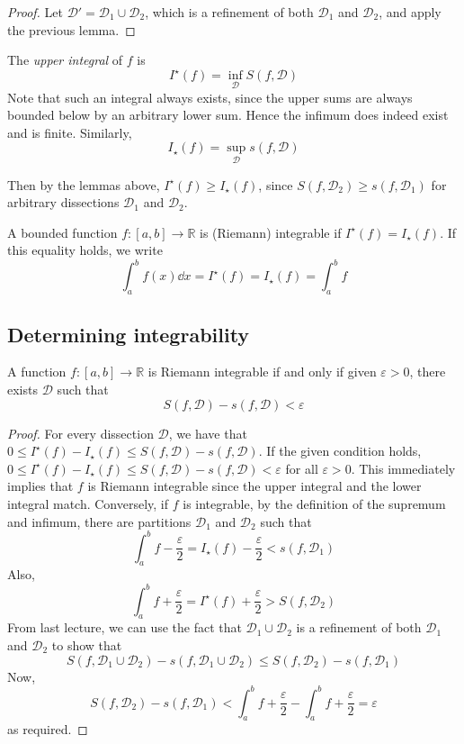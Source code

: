 \begin{proof}
	Let \(\mathcal D' = \mathcal D_1 \cup \mathcal D_2\), which is a refinement of both \(\mathcal D_1\) and \(\mathcal D_2\), and apply the previous lemma.
\end{proof}
\begin{definition}
	The \textit{upper integral} of \(f\) is
	\[
		I^\star(f) = \inf_{\mathcal D} S(f, \mathcal D)
	\]
	Note that such an integral always exists, since the upper sums are always bounded below by an arbitrary lower sum.
	Hence the infimum does indeed exist and is finite.
	Similarly,
	\[
		I_\star(f) = \sup_{\mathcal D} s(f, \mathcal D)
	\]
\end{definition}
\noindent Then by the lemmas above, \(I^\star(f) \geq I_\star(f)\), since \(S(f, \mathcal D_2) \geq s(f, \mathcal D_1)\) for arbitrary dissections \(\mathcal D_1\) and \(\mathcal D_2\).
\begin{definition}
	A bounded function \(f \colon [a, b] \to \mathbb R\) is (Riemann) integrable if \(I^\star(f) = I_\star(f)\).
	If this equality holds, we write
	\[
		\int_a^b f(x) \dd{x} = I^\star(f) = I_\star(f) = \int_a^b f
	\]
\end{definition}

\subsection{Determining integrability}
\begin{theorem}
	A function \(f \colon [a, b] \to \mathbb R\) is Riemann integrable if and only if given \(\varepsilon > 0\), there exists \(\mathcal D\) such that
	\[
		S(f, \mathcal D) - s(f, \mathcal D) < \varepsilon
	\]
\end{theorem}
\begin{proof}
	For every dissection \(\mathcal D\), we have that \(0 \leq I^\star(f) - I_\star(f) \leq S(f, \mathcal D) - s(f, \mathcal D)\).
	If the given condition holds, \(0 \leq I^\star(f) - I_\star(f) \leq S(f, \mathcal D) - s(f, \mathcal D) < \varepsilon\) for all \(\varepsilon > 0\).
	This immediately implies that \(f\) is Riemann integrable since the upper integral and the lower integral match.
	Conversely, if \(f\) is integrable, by the definition of the supremum and infimum, there are partitions \(\mathcal D_1\) and \(\mathcal D_2\) such that
	\[
		\int_a^b f - \frac{\varepsilon}{2} = I_\star(f) - \frac{\varepsilon}{2} < s(f, \mathcal D_1)
	\]
	Also,
	\[
		\int_a^b f + \frac{\varepsilon}{2} = I^\star(f) + \frac{\varepsilon}{2} > S(f, \mathcal D_2)
	\]
	From last lecture, we can use the fact that \(\mathcal D_1 \cup \mathcal D_2\) is a refinement of both \(\mathcal D_1\) and \(\mathcal D_2\) to show that
	\[
		S(f, \mathcal D_1 \cup \mathcal D_2) - s(f, \mathcal D_1 \cup \mathcal D_2) \leq S(f, \mathcal D_2) - s(f, \mathcal D_1)
	\]
	Now,
	\[
		S(f, \mathcal D_2) - s(f, \mathcal D_1) < \int_a^b f + \frac{\varepsilon}{2} - \int_a^b f + \frac{\varepsilon}{2} = \varepsilon
	\]
	as required.
\end{proof}

